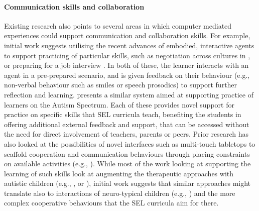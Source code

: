 \documentclass[prodmode,acmtochi]{acmsmall}
\begin{document}
\paragraph{Communication skills and collaboration} Existing research also points to several areas in which computer mediated experiences could support communication and collaboration skills. For example, initial work suggests utilising the recent advances of embodied, interactive agents to support practicing of particular skills, such as negotiation across cultures in \cite{Core2006}, or preparing for a job interview \cite{Hoque2013}. In both of these, the learner interacts with an agent in a pre-prepared scenario, and is given feedback on their behaviour (e.g., non-verbal behaviour such as smiles or speech prosodics) to support further reflection and learning.  presents a similar system aimed at supporting practice of learners on the Autism Spectrum. Each of these provides novel support for practice on specific skills that SEL curricula teach, benefiting the students in offering additional external feedback and support, that can be accessed without the need for direct involvement of teachers, parents or peers.
%
Prior research has also looked at the possibilities of novel interfaces such as multi-touch tabletops to scaffold cooperation and communication behaviours through placing constraints on available activities (e.g., \cite{Yuill2012}). While most of the work looking at supporting the learning of such skills look at augmenting the therapeutic approaches with autistic children (e.g., \cite{Piper2006}, or \cite{Zarin2011}), initial work suggests that similar approaches might translate also to interactions of neuro-typical children (e.g., \cite{Hinske2009,Antle2013,Cao2010,Kharrufa2010}) and the more complex cooperative behaviours that the SEL curricula aim for there.  
\end{document}
